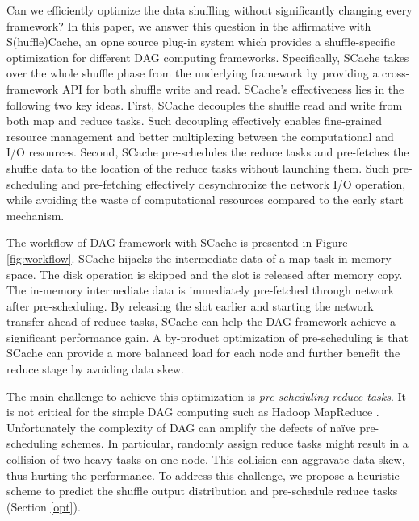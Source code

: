 Can we efficiently optimize the data shuffling without significantly changing every framework?
In this paper, we answer this question in the affirmative with S(huffle)Cache, an opne source plug-in system which provides a shuffle-specific optimization for different DAG computing frameworks.
Specifically, SCache takes over the whole shuffle phase from the underlying framework by providing a cross-framework API for both shuffle write and read.
SCache's effectiveness lies in the following two key ideas.
First, SCache decouples the shuffle read and write from both map and reduce tasks.
Such decoupling effectively enables fine-grained resource management and better multiplexing between the computational and I/O resources.
Second,
SCache pre-schedules the reduce tasks and pre-fetches the shuffle data to the location of the reduce tasks without launching them.
Such pre-scheduling and pre-fetching effectively desynchronize the network I/O operation, while avoiding the waste of computational resources compared to the early start mechanism.

The workflow of DAG framework with SCache is presented in Figure \ref{fig:workflow}. SCache hijacks the intermediate data of a map task in memory space. The disk operation is skipped and the slot is released after memory copy. The in-memory intermediate data is immediately pre-fetched through network after pre-scheduling. By releasing the slot earlier and starting the network transfer ahead of reduce tasks, SCache can help the DAG framework achieve a significant performance gain. A by-product optimization of pre-scheduling is that SCache can provide a more balanced load for each node and further benefit the reduce stage by avoiding data skew.

The main challenge to achieve this optimization is \textit{pre-scheduling reduce tasks}. It is not critical for the simple DAG computing such as Hadoop MapReduce \cite{mapreduce}. Unfortunately the complexity of DAG can amplify the defects of na\"{i}ve pre-scheduling schemes. In particular, randomly assign reduce tasks might result in a collision of two heavy tasks on one node. This collision can aggravate data skew, thus hurting the performance. To address this challenge, we propose a heuristic scheme to predict the shuffle output distribution and pre-schedule reduce tasks (Section \ref{opt}).

